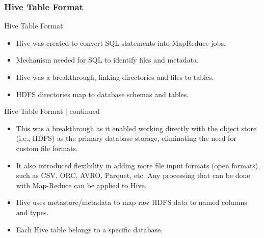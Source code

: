 \subsubsection{Hive Table Format}
\begin{frame}{Hive Table Format}

	\begin{itemize}
		\item Hive was created to convert SQL statements into MapReduce jobs. \pause
		\item Mechanism needed for SQL to identify files and metadata. \pause
		\item Hive was a breakthrough, linking directories and files to tables. \pause
		\item HDFS directories map to database schemas and tables. \pause

	
	\end{itemize}
	\end{frame}
\begin{frame}{Hive Table Format | continued}

	\begin{itemize}
		\item This was a breakthrough as it enabled working directly with the object store (i.e., HDFS) as the primary database storage, eliminating the need for custom file formats. \pause
		\item It also introduced flexibility in adding more file input formats (open formats), such as CSV, ORC, AVRO, Parquet, etc. Any processing that can be done with Map-Reduce can be applied to Hive. \pause
        \item Hive uses metastore/metadata to map raw HDFS data to named columns and types. \pause
		\item Each Hive table belongs to a specific database. \pause
	
	\end{itemize}
	\end{frame}
